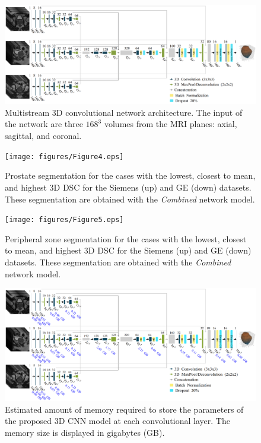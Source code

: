 \begin{figure}[ht]
    \centering
    \includegraphics[totalheight=.282\textheight]{figures/Figure3.eps}
    \caption{Multistream 3D convolutional network architecture. The input of the network are three $168^3$ volumes from the MRI planes: axial, sagittal, and coronal. }
    \label{fig:fig_3}
\end{figure}

\begin{figure}[ht]
    \centering
    \texttt{[image: figures/Figure4.eps]}
    \caption{Prostate segmentation for the cases with the lowest, closest to mean, and highest 3D DSC for the Siemens (up) and GE (down) datasets. These segmentation are obtained with the \emph{Combined} network model.  }
    \label{fig:resseg}
\end{figure} 

\begin{figure}[ht]
    \centering
    \texttt{[image: figures/Figure5.eps]}
    \caption{Peripheral zone segmentation for the cases with the lowest, closest to mean, and highest 3D DSC for the Siemens (up) and GE (down) datasets. These segmentation are obtained with the \emph{Combined} network model.  }
    \label{fig:ressegpz}
\end{figure} 

\begin{figure}[ht]
    \centering
    \includegraphics[totalheight=.32\textheight]{figures/Figure6.eps}
    \caption{Estimated amount of memory required to store the parameters of the proposed 3D CNN model at each convolutional layer. The memory size is displayed in gigabytes (GB). }
    \label{fig:nn_size}
\end{figure}